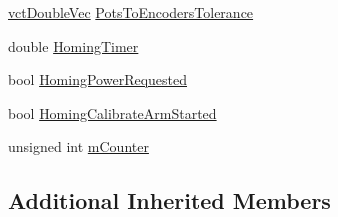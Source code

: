 \begin{DoxyCompactItemize}
\begin{tabbing}
\end{tabbing}\item 
\hyperlink{vct_dynamic_vector_types_8h_ade4b3068c86fb88f41af2e5187e491c2}{vct\-Double\-Vec} \hyperlink{classmts_intuitive_research_kit_arm_a288d1f973a27320bc3dcb703337b63f0}{Pots\-To\-Encoders\-Tolerance}
\item 
double \hyperlink{classmts_intuitive_research_kit_arm_aef35907dc2043c79b4f8b582e3516a64}{Homing\-Timer}
\item 
bool \hyperlink{classmts_intuitive_research_kit_arm_ae365d0f876fccb717f2577eea7ad080b}{Homing\-Power\-Requested}
\item 
bool \hyperlink{classmts_intuitive_research_kit_arm_a85be3c5241a21fccdf87a98ed344726e}{Homing\-Calibrate\-Arm\-Started}
\item 
unsigned int \hyperlink{classmts_intuitive_research_kit_arm_a3731f1a0cab4cfa11916ab5fd50ec643}{m\-Counter}
\end{DoxyCompactItemize}
\subsection*{Additional Inherited Members}


